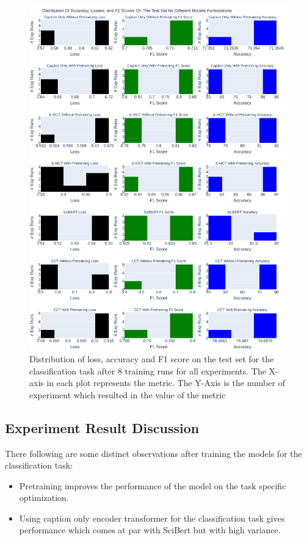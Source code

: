\begin{figure}[p!]
    \centering
    \includegraphics[width=\maxwidth{\textwidth}]{src/images/Metric-Distribution-For-Test-Set.pdf}
    \caption{Distribution of loss, accuracy and F1 score on the test set for the classification task after 8 training runs for all experiments. The X-axis in each plot represents the metric. The Y-Axis is the number of experiment which resulted in the value of the metric}
    \label{figure\arabic{figurecounter}}
\end{figure}

\FloatBarrier

\subsection{Experiment Result Discussion}
\label{table_classification:experiment-result:result-discussion}
There following are some distinct observations after training the models for the classification task:
\begin{itemize}
    \item Pretraining improves the performance of the model on the task specific optimization. 
    \item Using caption only encoder transformer for the classification task gives performance which comes at par with SciBert but with high variance. 
\end{itemize}

